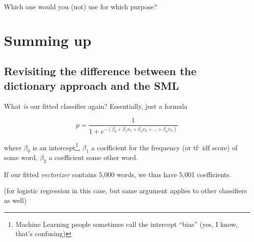 \documentclass[compress]{beamer}
\begin{document}
\begin{frame}{Which one would you (not) use for which purpose?}
	
\end{frame}




\section{Summing up}

\subsection{Revisiting the difference between the dictionary approach and the SML}


\begin{frame}{What \emph{is} our fitted classifier again?}
	Essentially, just a formula 
	
	$$p = \frac{1}{1 + e^{-(\beta_0 + \beta_1 x_1 + \beta_2 x_2 + \ldots + \beta_n x_n)}}$$
	
	where $\beta_0$ is an intercept\footnote{Machine Learning people sometimes call the intercept ``bias'' (yes, I know, that's confusing)}, $\beta_1$ a coefficient for the frequency (or tf$\cdot$ idf score) of some word, $\beta_2$ a coefficient some other word.
	
	If our fitted \emph{vectorizer} contains 5,000 words, we thus have 5,001 coefficients.
	
	\tiny{(for logistic regression in this case, but same argument applies to other classifiers as well)}
	
\end{frame}
\end{document}
